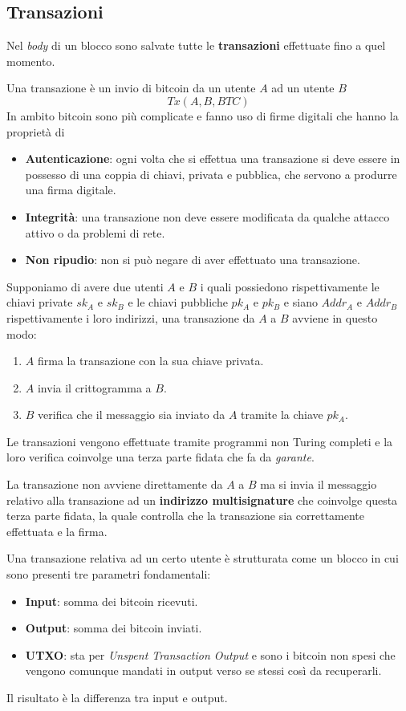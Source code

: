 \subsection{Transazioni}
Nel \emph{body} di un blocco sono salvate tutte le \textbf{transazioni} effettuate fino a quel momento.

Una transazione \`e un invio di bitcoin da un utente $A$ ad un utente $B$
\[ Tx(A, B, BTC) \]
In ambito bitcoin sono pi\`u complicate e fanno uso di firme digitali che hanno la propriet\`a di
\begin{itemize}
	\item \textbf{Autenticazione}: ogni volta che si effettua una transazione si deve essere in possesso di una coppia
	      di chiavi, privata e pubblica, che servono a produrre una firma digitale.
	\item \textbf{Integrit\`a}: una transazione non deve essere modificata da qualche attacco attivo o da problemi di
	      rete.
	\item \textbf{Non ripudio}: non si pu\`o negare di aver effettuato una transazione.
\end{itemize}
Supponiamo di avere due utenti $A$ e $B$ i quali possiedono rispettivamente le chiavi private $sk_A$ e $sk_B$ e le
chiavi pubbliche $pk_A$ e $pk_B$ e siano $Addr_A$ e $Addr_B$ rispettivamente i loro indirizzi, una transazione da $A$
a $B$ avviene in questo modo:
\begin{enumerate}
	\item $A$ firma la transazione con la sua chiave privata.
	\item $A$ invia il crittogramma a $B$.
	\item $B$ verifica che il messaggio sia inviato da $A$ tramite la chiave $pk_A$.
\end{enumerate}
Le transazioni vengono effettuate tramite programmi non Turing completi e la loro verifica coinvolge una terza parte
fidata che fa da \emph{garante}.

La transazione non avviene direttamente da $A$ a $B$ ma si invia il messaggio relativo alla transazione ad un
\textbf{indirizzo multisignature} che coinvolge questa terza parte fidata, la quale controlla che la transazione
sia correttamente effettuata e la firma.

Una transazione relativa ad un certo utente \`e strutturata come un blocco in cui sono presenti tre parametri
fondamentali:
\begin{itemize}
	\item \textbf{Input}: somma dei bitcoin ricevuti.
	\item \textbf{Output}: somma dei bitcoin inviati.
	\item \textbf{UTXO}: sta per \emph{Unspent Transaction Output} e sono i bitcoin non spesi che vengono comunque
	      mandati in output verso se stessi cos\`i da recuperarli.
\end{itemize}
Il risultato \`e la differenza tra input e output.

